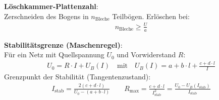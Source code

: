         \textbf{Löschkammer-Plattenzahl}: \\
        Zerschneiden des Bogens in \(n_{\text{Bleche}}\) Teilbögen. Erlöschen bei:
        \begin{align*}
            n_{\text{Bleche}} \ge \frac{U}{a}
        \end{align*}

        \textbf{Stabilitätsgrenze (Maschenregel)}: \\
        Für ein Netz mit Quellspannung \(U_0\) und Vorwiderstand \(R\):
        \begin{align*}
            U_0 = R \cdot I + U_B(I) \quad \text{mit} \quad U_B(I) = a + b \cdot l + \frac{c + d \cdot l}{I}
        \end{align*}
        Grenzpunkt der Stabilität (Tangentenzustand):
        \begin{align*}
            I_{\text{stab}} = \frac{2(c + d \cdot l)}{U_0 - (a + b \cdot l)} \qquad R_{\text{max}} = \frac{c + d \cdot l}{I_{\text{stab}}^2} = \frac{U_0 - U_B(I_{\text{stab}})}{I_{\text{stab}}}
        \end{align*}
